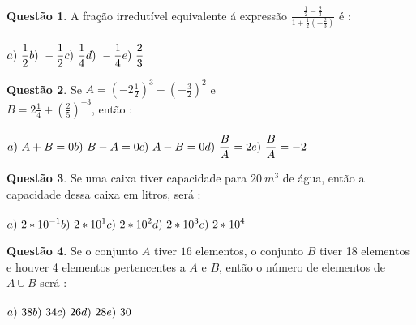 \documentclass[11pt, twocolumn]{article}
\renewcommand{\=}[1]{\stackrel{#1}{=}} 																					%
\theoremstyle{definition}
\newtheorem{quest}{Quest\~ao}
\begin{document}
%

\begin{quest}
 	A fra\c{c}\~ao irredut\'ivel equivalente \'a express\~ao \(\displaystyle \frac{\frac{1}{2}-\frac{2}{3}}{1+\frac{1}{2}(-\frac{2}{3})}\) \'e : \\ \\
	\(\displaystyle a)\ \frac{1}{2} \hfill b)\ -\frac{1}{2} \hfill c)\ \frac{1}{4} \hfill d)\ -\frac{1}{4} \hfill e)\ \frac{2}{3} \)
\end{quest}

\hline
\vfill

\begin{quest}
	Se \(\displaystyle A = (-2\frac{1}{2})^3 - (-\frac{3}{2})^2\) e \\ \(\displaystyle B = 2\frac{1}{4}+(\frac{2}{5})^{-3}\), ent\~ao : \\ \\
	\(\displaystyle a)\ A + B = 0 \hfill b)\ B - A = 0 \hfill c)\ A - B = 0 \hfill \\ d)\ \frac{B}{A} = 2 \hfill e)\ \frac{B}{A} = -2 \)
\end{quest}

\hline
\vfill

\begin{quest}
	Se uma caixa tiver capacidade para $20\ m^3$ de \'agua, ent\~ao a capacidade dessa caixa em litros, ser\'a : \\ \\
	\(\displaystyle a)\ 2*10^{-1} \hfill b)\ 2*10^{1} \hfill c)\ 2*10^{2} \hfill \\ d)\ 2*10^{3} \hfill e)\ 2*10^{4} \)
\end{quest}

\hline
\vfill

\begin{quest}
	Se o conjunto $A$ tiver $16$ elementos, o conjunto $B$ tiver 18 elementos e houver 4 elementos pertencentes a $A$ e $B$, ent\~ao o n\'umero de elementos de $A \cup B$ ser\'a : \\ \\
	\(\displaystyle a)\ 38 \hfill b)\ 34 \hfill c)\ 26 \hfill d)\ 28 \hfill e)\ 30 \)
\end{quest}
\end{document}
